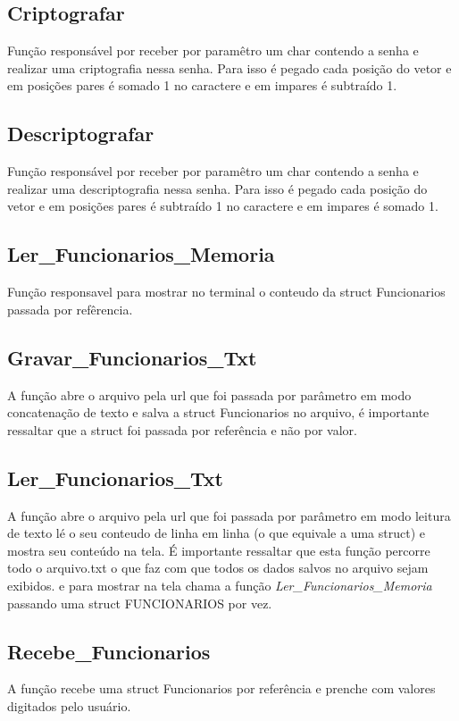 \documentclass{article}
\begin{document}
\subsection{Criptografar}
	Função responsável por receber por paramêtro um char contendo a senha e realizar uma criptografia nessa senha. Para isso é pegado cada posição do vetor e em posições pares é somado 1 no caractere e em impares é subtraído 1.

\subsection{Descriptografar}
	Função responsável por receber por paramêtro um char contendo a senha e realizar uma descriptografia nessa senha. Para isso é pegado cada posição do vetor e em posições pares é subtraído 1 no caractere e em impares é somado 1.


\subsection{Ler\_Funcionarios\_Memoria}
	Função responsavel para mostrar no terminal o conteudo da struct Funcionarios passada por  refêrencia.

\subsection{Gravar\_Funcionarios\_Txt}
	A função abre o arquivo pela url que foi passada por parâmetro em modo concatenação de texto e salva a struct Funcionarios  no arquivo, é importante ressaltar que  a struct foi passada por referência e não por valor.

\subsection{Ler\_Funcionarios\_Txt}
	A função abre o arquivo pela url que foi passada por parâmetro em modo leitura de texto lé o seu conteudo de linha em linha (o que equivale a uma struct) e mostra seu conteúdo na tela. É importante ressaltar que esta função percorre todo o arquivo.txt o que faz com que todos os dados salvos no arquivo sejam exibidos. e para mostrar na tela chama a função \textit{Ler\_Funcionarios\_Memoria} passando uma struct FUNCIONARIOS  por vez.

\subsection{Recebe\_Funcionarios}
	A função recebe uma struct  Funcionarios por referência e prenche com valores digitados pelo usuário.
\end{document}
